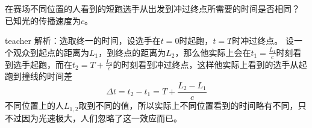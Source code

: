 \begin{example}
在赛场不同位置的人看到的短跑选手从出发到冲过终点所需要的时间是否相同？
已知光的传播速度为$c$。
\begin{taggedblock}{teacher}
\newline
解析：选取终一的时间，设选手在$t=0$时起跑，$t=T$时冲过终点。
设一个观众到起点的距离为$L_1$，到终点的距离为$L_2$，那么他实际上会在$t_1 = \frac{L_1}{c}$时刻看到选手起跑，而在$t_2=T+\frac{L_2}{c}$的时刻看到冲过终点，这样他实际上看到的选手从起跑到撞线的时间差
\[
\Delta t = t_2-t_1 = T+\frac{L_2-L_1}{c}
\]
不同位置上的人$L_{1,2}$取到不同的值，所以实际上不同位置看到的时间略有不同，只不过因为光速极大，人们忽略了这一效应而已。
\end{taggedblock}
\end{example}




